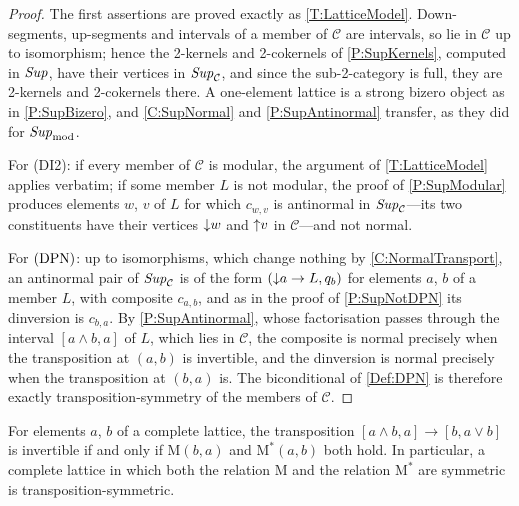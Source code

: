 \begin{proof}
  \leanok
  The first assertions are proved exactly as \thex\ref{T:LatticeModel}. Down-segments, up-segments and intervals of a member of \(\mathcal{C}\) are intervals, so lie in \(\mathcal{C}\) up to isomorphism; hence the 2-kernels and 2-cokernels of \prox\ref{P:SupKernels}, computed in \(\mathit{Sup}\), have their vertices in \(\mathit{Sup}_{\mathcal{C}}\), and since the sub-2-category is full, they are 2-kernels and 2-cokernels there. A one-element lattice is a strong bizero object as in \prox\ref{P:SupBizero}, and \corx\ref{C:SupNormal} and \prox\ref{P:SupAntinormal} transfer, as they did for \(\mathit{Sup}_{\mathrm{mod}}\).

	For \textup{(DI2)}: if every member of \(\mathcal{C}\) is modular, the argument of \thex\ref{T:LatticeModel} applies verbatim; if some member \(L\) is not modular, the proof of \prox\ref{P:SupModular} produces elements \(w\), \(v\) of \(L\) for which \(c_{w,v}\) is antinormal in \(\mathit{Sup}_{\mathcal{C}}\)---its two constituents have their vertices \({\downarrow}w\) and \({\uparrow}v\) in \(\mathcal{C}\)---and not normal.

	For \(\textup{(DPN)}\): up to isomorphisms, which change nothing by \corx\ref{C:NormalTransport}, an antinormal pair of \(\mathit{Sup}_{\mathcal{C}}\) is of the form \(({\downarrow}a\to L,q_{b})\) for elements \(a\), \(b\) of a member \(L\), with composite \(c_{a,b}\), and as in the proof of \prox\ref{P:SupNotDPN} its dinversion is \(c_{b,a}\). By \prox\ref{P:SupAntinormal}, whose factorisation passes through the interval \([a\wedge b,a]\) of \(L\), which lies in \(\mathcal{C}\), the composite is normal precisely when the transposition at \((a,b)\) is invertible, and the dinversion is normal precisely when the transposition at \((b,a)\) is. The biconditional of \ref{Def:DPN} is therefore exactly transposition-symmetry of the members of \(\mathcal{C}\).
\end{proof}

\begin{lemma}
  \label{L:ModularPairs}  \leanok
  For elements \(a\), \(b\) of a complete lattice, the transposition \([a\wedge b,a]\to[b,a\vee b]\) is invertible if and only if \(\mathrm{M}(b,a)\) and \(\mathrm{M}^{*}(a,b)\) both hold. In particular, a complete lattice in which both the relation \(\mathrm{M}\) and the relation \(\mathrm{M}^{*}\) are symmetric is transposition-symmetric.
\end{lemma}

